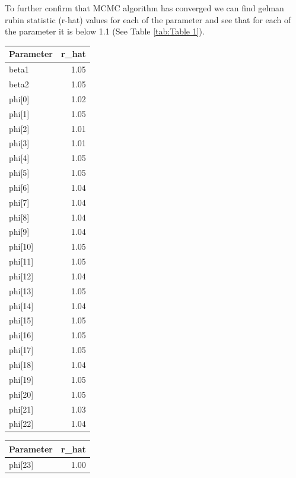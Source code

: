 \documentclass[enabledeprecatedfontcommands,parskip=half,twoside=semi,BCOR=0mm]{scrreprt}
\numberwithin{equation}{chapter}
\theoremstyle{definition}
\theoremstyle{remark}
\begin{document}
    To further confirm that MCMC algorithm has converged we can find gelman rubin statistic (r-hat) values for each of the parameter and see that for each of the parameter it is below 1.1 (See Table \ref{tab:Table 1}).
    \begin{table}[h!]
    \centering
    \begin{adjustbox}{max width=\textwidth}
    \begin{minipage}{0.48\textwidth}
    \centering
    \begin{tabular}{l r}
    \textbf{Parameter} & \textbf{r\_hat} \\
    \hline
    beta1 & 1.05 \\
    beta2 & 1.05 \\
    phi[0] & 1.02 \\
    phi[1] & 1.05 \\
    phi[2] & 1.01 \\
    phi[3] & 1.01 \\
    phi[4] & 1.05 \\
    phi[5] & 1.05 \\
    phi[6] & 1.04 \\
    phi[7] & 1.04 \\
    phi[8] & 1.04 \\
    phi[9] & 1.04 \\
    phi[10] & 1.05 \\
    phi[11] & 1.05 \\
    phi[12] & 1.04 \\
    phi[13] & 1.05 \\
    phi[14] & 1.04 \\
    phi[15] & 1.05 \\
    phi[16] & 1.05 \\
    phi[17] & 1.05 \\
    phi[18] & 1.04 \\
    phi[19] & 1.05 \\
    phi[20] & 1.05 \\
    phi[21] & 1.03 \\
    phi[22] & 1.04 \\
    \end{tabular}
    \end{minipage}
    \hfill
    \begin{minipage}{0.48\textwidth}
    \centering
    \begin{tabular}{l r}
    \textbf{Parameter} & \textbf{r\_hat} \\
    \hline
    phi[23] & 1.00 \\

\end{tabular}
\end{minipage}
\end{adjustbox}
\end{table}
\end{document}
